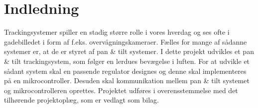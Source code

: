 \section*{Indledning}
Trackingsystemer spiller en stadig større rolle i vores hverdag og ses ofte i gadebilledet i form 
af f.eks. overvågningskameraer.
Fælles for mange af sådanne systemer er, at de er styret af pan \& tilt systemer. 
I dette projekt udvikles et pan \& tilt trackingsystem, som følger en lerdues bevægelse i 
luften. For at udvikle et sådant system skal en passende regulator designes og denne skal implementeres
på en mikrocontroller. 
Desuden skal kommunikation mellem pan \& tilt systemet og mikrocontrolleren oprettes.
Projektet udføres i overensstemmelse med det tilhørende projektoplæg, som er vedlagt 
som bilag.
